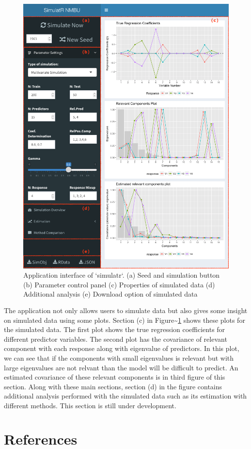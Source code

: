 \documentclass[12pt,A4paper,authoryear]{elsarticle} %
\theoremstyle{definition}
\theoremstyle{definition}
\theoremstyle{remark}
\begin{document}
\begin{figure}[!hbt]

{\centering \includegraphics[width=0.95\linewidth]{images/screenshots/AppInterface} 

}

\caption{Application interface of `simulatr`. (a) Seed and simulation button (b) Parameter control panel (c) Properties of simulated data (d) Additional analysis (e) Download option of simulated data}\label{fig:AppSimulatr}
\end{figure}

The application not only allows users to simulate data but also gives
some insight on simulated data using some plots. Section (c) in
Figure\textasciitilde{}\ref{fig:AppSimulatr} shows these plots for the
simulated data. The first plot shows the true regression coefficients
for different predictor variables. The second plot has the covariance of
relevant component with each response along with eigenvalue of
predictors. In this plot, we can see that if the components with small
eigenvalues is relevant but with large eigenvalues are not relvant than
the model will be difficult to predict. An estimated covariance of these
relevant components is in third figure of this section. Along with these
main sections, section (d) in the figure contains additional analysis
performed with the simulated data such as its estimation with different
methods. This section is still under development.

\section*{References}\label{references}


\renewcommand\refname{References}

\end{document}
